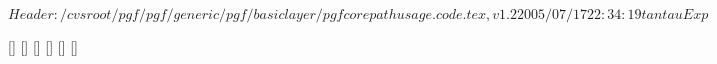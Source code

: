 \ProvidesFileRCS $Header: /cvsroot/pgf/pgf/generic/pgf/basiclayer/pgfcorepathusage.code.tex,v 1.2 2005/07/17 22:34:19 tantau Exp $

%


%
%
%

[]{\def\pgf@up@stroke{stroke}}
[]{\def\pgf@up@stroke{stroke}}
[]{\def\pgf@up@fill{fill}}
[]{\def\pgf@up@clip{clip}}
[]{}
[]{\def\pgf@up@bb{\pgf@relevantforpicturesizefalse}}

